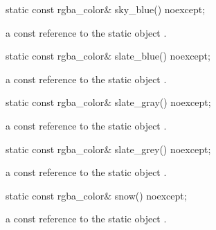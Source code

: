 \begin{itemdecl}
    static const rgba_color& sky_blue() noexcept;
\end{itemdecl}
\begin{itemdescr}
    \pnum
    \returns
    a const reference to the static  object .
\end{itemdescr}

\begin{itemdecl}
    static const rgba_color& slate_blue() noexcept;
\end{itemdecl}
\begin{itemdescr}
    \pnum
    \returns
    a const reference to the static  object .
\end{itemdescr}

\begin{itemdecl}
    static const rgba_color& slate_gray() noexcept;
\end{itemdecl}
\begin{itemdescr}
    \pnum
    \returns
    a const reference to the static  object .
\end{itemdescr}

\begin{itemdecl}
    static const rgba_color& slate_grey() noexcept;
\end{itemdecl}
\begin{itemdescr}
    \pnum
    \returns
    a const reference to the static  object .
\end{itemdescr}

\begin{itemdecl}
    static const rgba_color& snow() noexcept;
\end{itemdecl}
\begin{itemdescr}
    \pnum
    \returns
    a const reference to the static  object .
\end{itemdescr}

